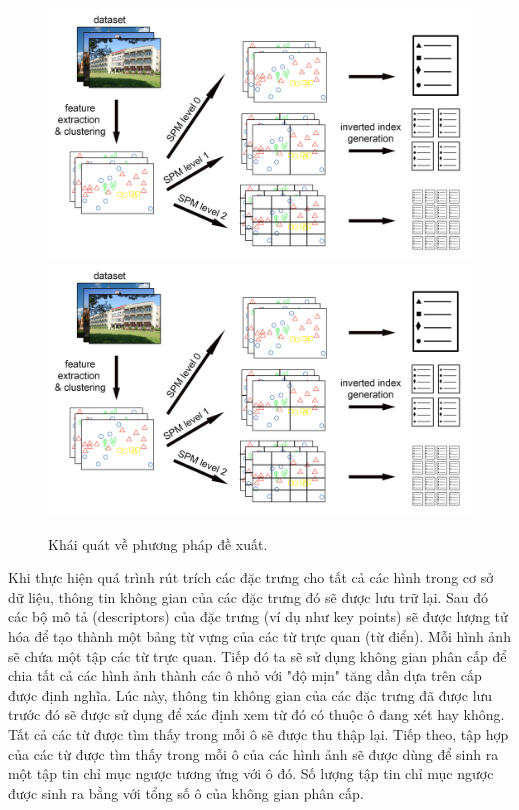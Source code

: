 \begin{figure}[!htbp]
  \begin{center}
    \leavevmode
    \ifpdf
      \includegraphics[scale=0.15]{basicIdea}
    \else
      \includegraphics[scale=0.15]{basicIdea}
    \fi
    \caption[Khái quát về phương pháp đề xuất]{Khái quát về phương pháp đề xuất.}
    \label{FigBasicIdea}
  \end{center}
\end{figure}

Khi thực hiện quá trình rút trích các đặc trưng cho tất cả các hình trong cơ sở dữ liệu, thông tin không gian của các đặc trưng đó sẽ được lưu trữ lại. Sau đó các bộ mô tả (descriptors) của đặc trưng (ví dụ như key points) sẽ được lượng tử hóa để tạo thành một bảng từ vựng của các từ trực quan (từ điển). Mỗi hình ảnh sẽ chứa một tập các từ trực quan. Tiếp đó ta sẽ sử dụng không gian phân cấp để chia tất cả các hình ảnh thành các ô nhỏ với "độ mịn" tăng dần dựa trên cấp được định nghĩa. Lúc này, thông tin không gian của các đặc trưng đã được lưu trước đó sẽ được sử dụng để xác định xem từ đó có thuộc ô đang xét hay không. Tất cả các từ được tìm thấy trong mỗi ô sẽ được thu thập lại. Tiếp theo, tập hợp của các từ được tìm thấy trong mỗi ô của các hình ảnh sẽ được dùng để sinh ra một tập tin chỉ mục ngược tương ứng với ô đó. Số lượng tập tin chỉ mục ngược được sinh ra bằng với tổng số ô của không gian phân cấp.

